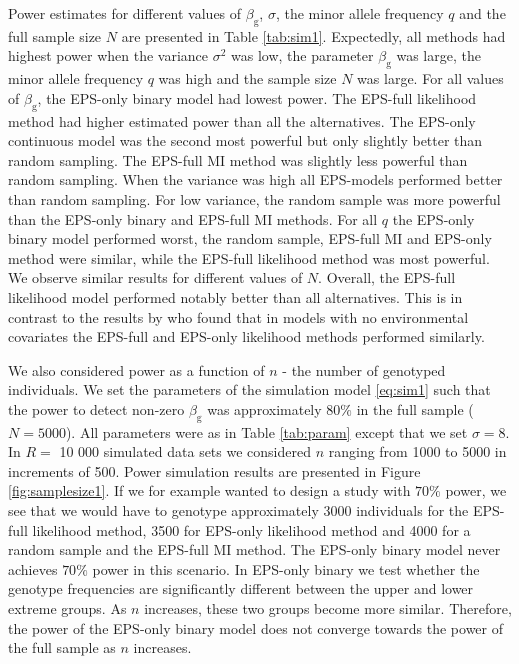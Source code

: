 \documentclass[10pt,a4paper]{article}
\begin{document}
Power estimates for different values of $\beta_{\text{g}}$,  $\sigma$, the minor allele frequency $q$ and the full sample size $N$ are presented in Table \ref{tab:sim1}. Expectedly, all methods had highest power when the variance $\sigma^2$ was low, the parameter $\beta_{\text{g}}$ was large, the minor allele frequency $q$ was high and the sample size $N$ was large. For all values of $\beta_{\text{g}}$, the EPS-only binary model had lowest power. The EPS-full likelihood method had higher estimated power than all the alternatives. The EPS-only continuous model was the second most powerful but only slightly better than random sampling. The EPS-full MI method was slightly less powerful than random sampling. When the variance was high all EPS-models performed better than random sampling. For low variance, the random sample was more powerful than the EPS-only binary and EPS-full MI methods. For all $q$ the EPS-only binary model performed worst, the random sample, EPS-full MI and EPS-only method were similar, while the EPS-full likelihood method was most powerful. We observe similar results for different values of $N$. Overall, the EPS-full likelihood model performed notably better than all alternatives. This is in contrast to the results by \cite{huang2007eps} who found that in models with no environmental covariates the EPS-full and EPS-only likelihood methods performed similarly.

We also considered power as a function of $n$ - the number of genotyped individuals. We set the parameters of the simulation model \eqref{eq:sim1} such that the power to detect non-zero $\beta_{\text{g}}$ was approximately $80\%$ in the full sample ($N=5000$). All parameters were as in Table \ref{tab:param} except that we set $\sigma = 8$. In $R=$ 10 000 simulated data sets we considered $n$ ranging from 1000 to 5000 in increments of 500. Power simulation results are presented in Figure \ref{fig:samplesize1}. If we for example wanted to design a study with $70\%$ power, we see that we would have to genotype approximately 3000 individuals for the EPS-full likelihood method, 3500 for EPS-only likelihood method and 4000 for a random sample and the EPS-full MI method. The EPS-only binary model never achieves $70\%$ power in this scenario. In EPS-only binary we test whether the genotype frequencies are significantly different between the upper and lower extreme groups. As $n$ increases, these two groups become more similar. Therefore, the power of the EPS-only binary model does not converge towards the power of the full sample as $n$ increases. 
\end{document}

